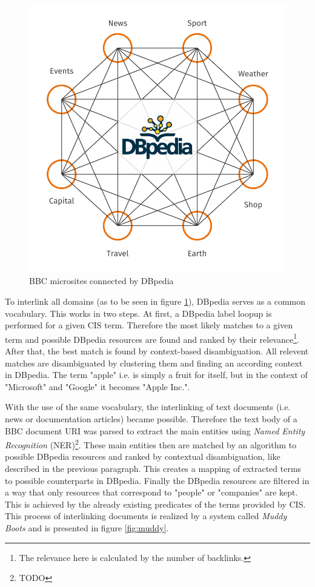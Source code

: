 \documentclass{llncs}
\begin{document}
\begin{figure}[!h]
  \centering
  \includegraphics[width=.75\textwidth]{images/dbpedia_dark}
  \caption{BBC microsites connected by DBpedia}
  \label{fig:dbpedia}
\end{figure}

To interlink all domains (as to be seen in figure \ref{fig:dbpedia}), DBpedia serves as a common vocabulary. This works in two steps. At first, a DBpedia label loopup is performed for a given CIS term. Therefore the most likely matches to a given term and possible DBpedia resources are found and ranked by their relevance\footnote{The relevance here is calculated by the number of backlinks.}. After that, the best match is found by context-based disambiguation. All relevent matches are disambiguated by clustering them and finding an according context in DBpedia. The term "apple" i.e. is simply a fruit for itself, but in the context of "Microsoft" and "Google" it becomes "Apple Inc.".

With the use of the same vocabulary, the interlinking of text documents (i.e. news or documentation articles) became possible. Therefore the text body of a BBC document URI was parsed to extract the main entities using \textit{Named Entity Recognition} (NER)\footnote{TODO}. These main entities then are matched by an algorithm to possible DBpedia resources and ranked by contextual disambiguation, like described in the previous paragraph. This creates a mapping of extracted terms to possible counterparts in DBpedia. Finally the DBpedia resources are filtered in a way that only resources that correspond to "people" or "companies" are kept. This is achieved by the already existing predicates of the terms provided by CIS. This process of interlinking documents is realized by a system called \textit{Muddy Boots} and is presented in figure \ref{fig:muddy}.
\end{document}
